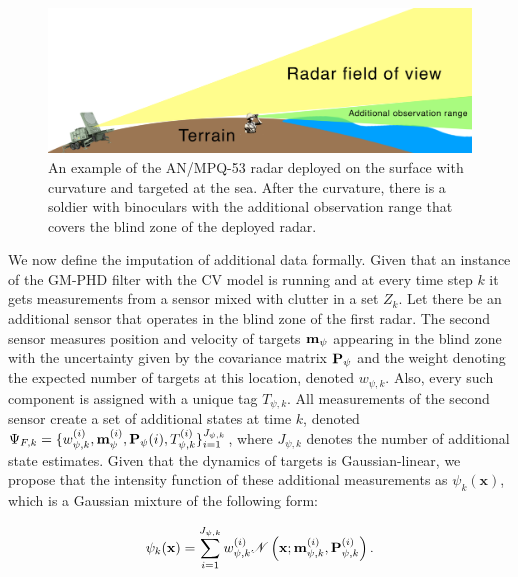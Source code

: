 \begin{figure}[ht]
    \centering
    \includegraphics[width=.95\linewidth]{figures/radar-additional-range.png}
    \caption[Example of radar blind zone mitigated with additional observation range from soldier with binoculars.]{An example of the AN/MPQ-53 radar deployed on the surface with curvature and targeted at the sea. After the curvature, there is a soldier with binoculars with the additional observation range that covers the blind zone of the deployed radar.}
    \label{fig:radar-additional-range}
\end{figure}

We now define the imputation of additional data formally. Given that an instance of the GM-PHD filter with the CV model is running and at every time step $k$ it gets measurements from a sensor mixed with clutter in a set $Z_k$. Let there be an additional sensor that operates in the blind zone of the first radar. The second sensor measures position and velocity of targets $\vecat{m}{\psi}$ appearing in the blind zone with the uncertainty given by the covariance matrix $\vecat{P}{\psi}$ and the weight denoting the expected number of targets at this location, denoted $w_{\psi, k}$. Also, every such component is assigned with a unique tag $T_{\psi, k}$. All measurements of the second sensor create a set of additional states at time $k$, denoted $\Psi_{F, k} = \{ w_{\psi, k}^{(i)}, \svecat{m}{\psi}{(i)}, \vecat{P}{\psi}{(i)}, T_{\psi, k}^{(i)} \}_{i=1}^{J_{\psi, k}}$, where $J_{\psi, k}$ denotes the number of additional state estimates. Given that the dynamics of targets is Gaussian-linear, we propose that the intensity function of these additional measurements as $\psi_k(\mathbf{x})$, which is a Gaussian mixture of the following form:

\begin{equation}\label{eq:gm-phd-fusion-fusion-intensity}
    \psi_k(\mathbf{x}) = \sum_{i=1}^{J_{\psi, k}} w_{\psi, k}^{(i)}
        \mathscr{N}\left(\mathbf{x}; \vecat{m}{\psi, k}^{(i)}, \vecat{P}{\psi, k}^{(i)}\right).
\end{equation}

